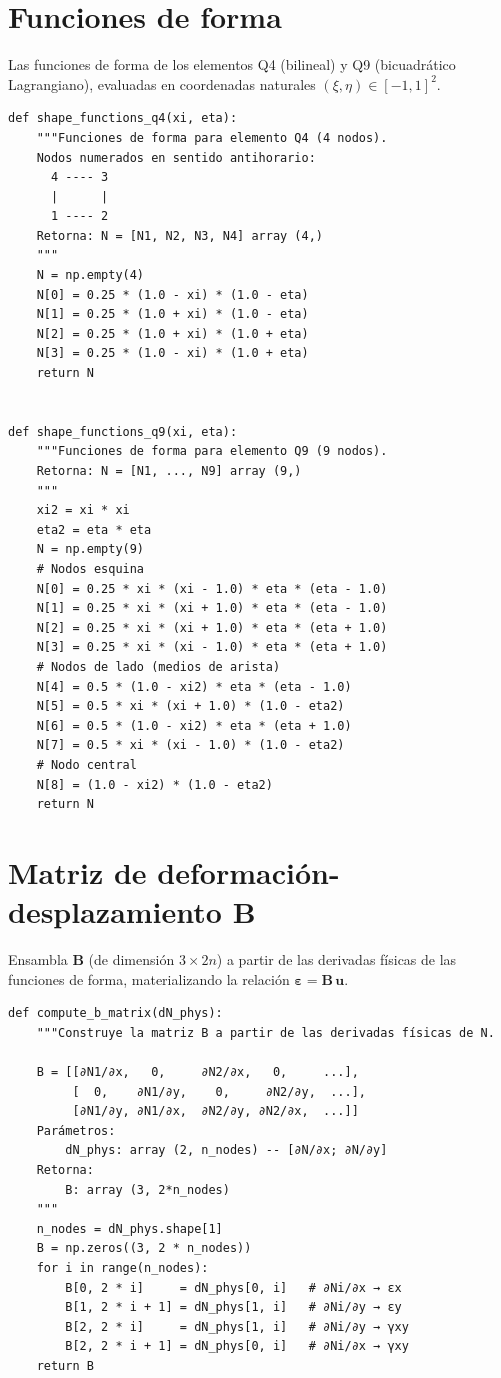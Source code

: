 \section{Funciones de forma}

Las funciones de forma de los elementos Q4 (bilineal) y Q9 (bicuadrático Lagrangiano), evaluadas en coordenadas naturales $(\xi,\eta) \in [-1,1]^2$.

\begin{lstlisting}
def shape_functions_q4(xi, eta):
    """Funciones de forma para elemento Q4 (4 nodos).
    Nodos numerados en sentido antihorario:
      4 ---- 3
      |      |
      1 ---- 2
    Retorna: N = [N1, N2, N3, N4] array (4,)
    """
    N = np.empty(4)
    N[0] = 0.25 * (1.0 - xi) * (1.0 - eta)
    N[1] = 0.25 * (1.0 + xi) * (1.0 - eta)
    N[2] = 0.25 * (1.0 + xi) * (1.0 + eta)
    N[3] = 0.25 * (1.0 - xi) * (1.0 + eta)
    return N


def shape_functions_q9(xi, eta):
    """Funciones de forma para elemento Q9 (9 nodos).
    Retorna: N = [N1, ..., N9] array (9,)
    """
    xi2 = xi * xi
    eta2 = eta * eta
    N = np.empty(9)
    # Nodos esquina
    N[0] = 0.25 * xi * (xi - 1.0) * eta * (eta - 1.0)
    N[1] = 0.25 * xi * (xi + 1.0) * eta * (eta - 1.0)
    N[2] = 0.25 * xi * (xi + 1.0) * eta * (eta + 1.0)
    N[3] = 0.25 * xi * (xi - 1.0) * eta * (eta + 1.0)
    # Nodos de lado (medios de arista)
    N[4] = 0.5 * (1.0 - xi2) * eta * (eta - 1.0)
    N[5] = 0.5 * xi * (xi + 1.0) * (1.0 - eta2)
    N[6] = 0.5 * (1.0 - xi2) * eta * (eta + 1.0)
    N[7] = 0.5 * xi * (xi - 1.0) * (1.0 - eta2)
    # Nodo central
    N[8] = (1.0 - xi2) * (1.0 - eta2)
    return N
\end{lstlisting}

\section{Matriz de deformación-desplazamiento B}

Ensambla $\bm{B}$ (de dimensión $3\times 2n$) a partir de las derivadas físicas de las funciones de forma, materializando la relación $\bm{\varepsilon} = \bm{B}\,\bm{u}$.

\begin{lstlisting}
def compute_b_matrix(dN_phys):
    """Construye la matriz B a partir de las derivadas físicas de N.

    B = [[∂N1/∂x,   0,     ∂N2/∂x,   0,     ...],
         [  0,    ∂N1/∂y,    0,     ∂N2/∂y,  ...],
         [∂N1/∂y, ∂N1/∂x,  ∂N2/∂y, ∂N2/∂x,  ...]]
    Parámetros:
        dN_phys: array (2, n_nodes) -- [∂N/∂x; ∂N/∂y]
    Retorna:
        B: array (3, 2*n_nodes)
    """
    n_nodes = dN_phys.shape[1]
    B = np.zeros((3, 2 * n_nodes))
    for i in range(n_nodes):
        B[0, 2 * i]     = dN_phys[0, i]   # ∂Ni/∂x → εx
        B[1, 2 * i + 1] = dN_phys[1, i]   # ∂Ni/∂y → εy
        B[2, 2 * i]     = dN_phys[1, i]   # ∂Ni/∂y → γxy
        B[2, 2 * i + 1] = dN_phys[0, i]   # ∂Ni/∂x → γxy
    return B
\end{lstlisting}

